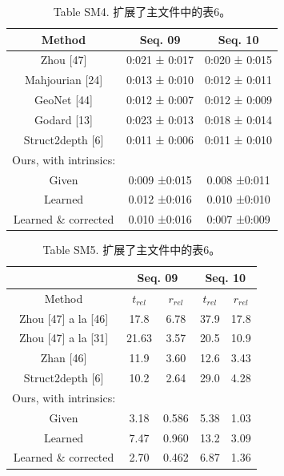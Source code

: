 \documentclass[10pt,journal,compsoc,UTF8]{IEEEtran}
\begin{document}
\begin{table}
  \centering
  \begin{tabular}{|c|c|c|}
  \hline
  Method&Seq. 09&Seq. 10\\
  \hline
  Zhou [47]            &0:021 ± 0:017& 0:020 ± 0:015\\
  Mahjourian [24]      &0:013 ± 0:010& 0:012 ± 0:011\\
  GeoNet [44]          &0:012 ± 0:007& 0:012 ± 0:009\\
  Godard [13]          &0:023 ± 0:013& 0:018 ± 0:014\\
  Struct2depth [6]     &0:011 ± 0:006& 0:011 ± 0:010\\
  \hline
  Ours, with intrinsics:&&\\
  Given                &0:009 ±0:015& 0.008 ±0:011\\
  Learned              &0.012 ±0:016& 0.010 ±0:010\\
  Learned \& corrected &0.010 ±0:016& 0:007 ±0:009\\
  \hline
  \end{tabular}
  \caption*{Table SM4. 扩展了主文件中的表6。}
\end{table}

\begin{table}
  \centering
  \begin{tabular}{|c|c|c|c|c|}
    \hline
     &\multicolumn{2}{c|}{Seq. 09} & \multicolumn{2}{c|}{Seq. 10} \\
    \hline
    Method & $t_{rel}$ & $r_{rel}$ & $t_{rel}$ & $r_{rel}$ \\
    \hline
    Zhou [47] a la [46] &17.8  &6.78 &37.9 &17.8\\
    Zhou [47] a la [31] &21.63 &3.57 &20.5 &10.9\\
    Zhan [46]           &11.9  &3.60 &12.6 &3.43\\
    Struct2depth [6]    &10.2  &2.64 &29.0 &4.28\\
    \hline
    Ours, with intrinsics:&&&&\\
    Given &3.18& 0.586& 5.38 &1.03\\
    Learned &7.47& 0.960& 13.2 &3.09\\
    Learned \& corrected &2.70& 0.462& 6.87& 1.36\\
    \hline
    \end{tabular}
  \caption*{Table SM5. 扩展了主文件中的表6。}
\end{table}
\end{document}
